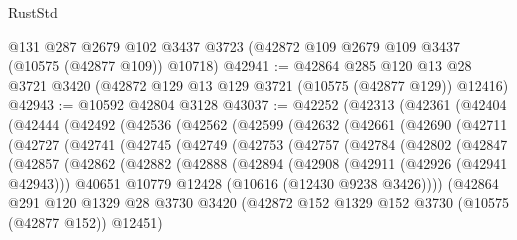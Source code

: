 \begin{lexlean}{RustStd}
\begin{coremodule}
    @131
    @287
    @2679
    @102
    @3437
    @3723
    (@42872 @109 @2679 @109 @3437 (@10575 (@42877 @109)) @10718)
@42941 := @42864
    @285
    @120
    @13
    @28
    @3721
    @3420
    (@42872 @129 @13 @129 @3721 (@10575 (@42877 @129)) @12416)
@42943 := @10592 @42804 @3128
@43037 := @42252
    (@42313
      (@42361
        (@42404
          (@42444
            (@42492
              (@42536
                (@42562
                  (@42599
                    (@42632
                      (@42661
                        (@42690
                          (@42711
                            (@42727
                              (@42741
                                (@42745
                                  (@42749
                                    (@42753
                                      (@42757
                                        (@42784
                                          (@42802
                                            (@42847
                                              (@42857
                                                (@42862
                                                  (@42882
                                                    (@42888
                                                      (@42894
                                                        (@42908
                                                          (@42911 (@42926 (@42941 @42943)))
                                                          @40651
                                                          @10779
                                                          @12428
                                                          (@10616 (@12430 @9238 @3426))))
                                                      (@42864
                                                        @291
                                                        @120
                                                        @1329
                                                        @28
                                                        @3730
                                                        @3420
                                                        (@42872
                                                          @152
                                                          @1329
                                                          @152
                                                          @3730
                                                          (@10575 (@42877 @152))
                                                          @12451)

\end{coremodule}
\end{lexlean}
